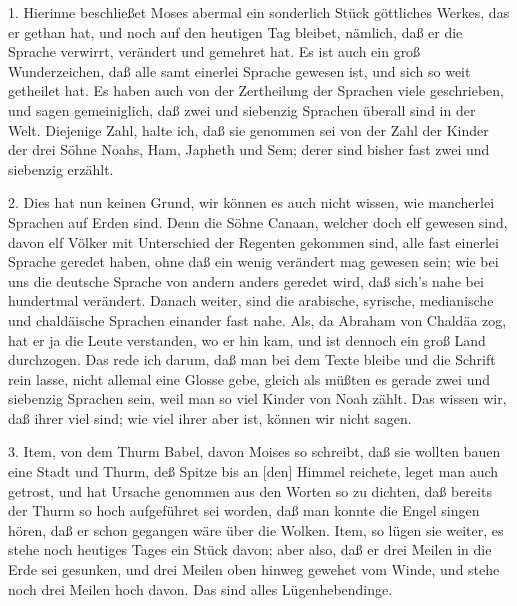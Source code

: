 1. Hierinne beschließet Moses abermal ein sonderlich Stück göttliches Werkes, das er gethan hat, und noch auf den heutigen Tag bleibet, nämlich, daß er die Sprache verwirrt, verändert und gemehret hat. Es ist auch ein groß Wunderzeichen, daß alle samt einerlei Sprache gewesen ist, und sich so weit getheilet hat. Es haben auch von der Zertheilung der Sprachen viele geschrieben, und sagen gemeiniglich, daß zwei und siebenzig Sprachen überall sind in der Welt. Diejenige Zahl, halte ich, daß sie genommen sei von der Zahl der Kinder der drei Söhne Noahs, Ham, Japheth und Sem; derer sind bisher fast zwei und siebenzig erzählt.

2. Dies hat nun keinen Grund, wir können es auch nicht wissen, wie mancherlei Sprachen auf Erden sind. Denn die Söhne Canaan, welcher doch elf gewesen sind, davon elf Völker mit Unterschied der Regenten gekommen sind, alle fast einerlei Sprache geredet haben, ohne daß ein wenig verändert mag gewesen sein; wie bei uns die deutsche Sprache von andern anders geredet wird, daß sich’s nahe bei hundertmal verändert. Danach weiter, sind die arabische, syrische, medianische und chaldäische Sprachen einander fast nahe. Als, da Abraham von Chaldäa zog, hat er ja die Leute verstanden, wo er hin kam, und ist dennoch ein groß Land durchzogen. Das rede ich darum, daß man bei dem Texte bleibe und die Schrift rein lasse, nicht allemal eine Glosse gebe, gleich als müßten es gerade zwei und siebenzig Sprachen sein, weil man so viel Kinder von Noah zählt. Das wissen wir, daß ihrer viel sind; wie viel ihrer aber ist, können wir nicht sagen.

3. Item, von dem Thurm Babel, davon Moises so schreibt, daß sie wollten bauen eine Stadt und Thurm, deß Spitze bis an [den] Himmel reichete, leget man auch getrost, und hat Ursache genommen aus den Worten so zu dichten, daß bereits der Thurm so hoch aufgeführet sei worden, daß man konnte die Engel singen hören, daß er schon gegangen wäre über die Wolken. Item, so lügen sie weiter, es stehe noch heutiges Tages ein Stück davon; aber also, daß er drei Meilen in die Erde sei gesunken, und drei Meilen oben hinweg gewehet vom Winde, und stehe noch drei Meilen hoch davon. Das sind alles Lügenhebendinge.

